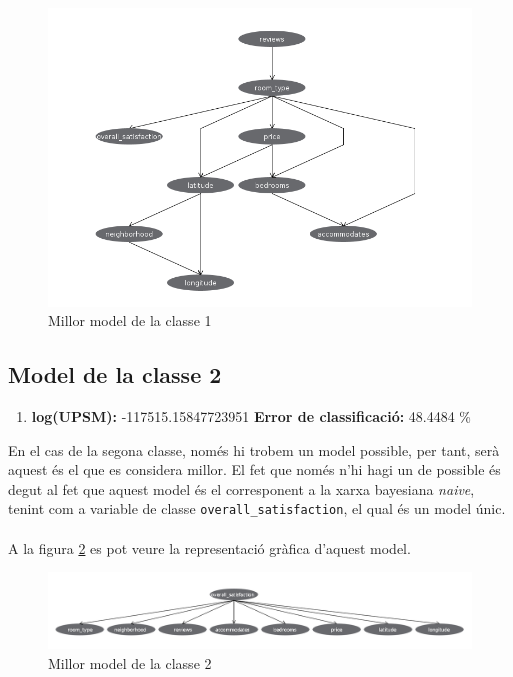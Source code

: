 	\begin{figure}[H]
		\centering
		\includegraphics[width=12cm]{imgs/modelclasse1.png}
		\caption{Millor model de la classe 1}
		\label{fig:model1}
	\end{figure}
	\vspace{0.5cm}
	
	\subsection{Model de la classe 2}
	\begin{enumerate}
		\item \textbf{log(UPSM):} -117515.15847723951 \textbf{Error de classificació:} 48.4484 \%
	\end{enumerate}
	\vspace{0.5cm}
	En el cas de la segona classe, només hi trobem un model possible, per tant, serà aquest és el que es considera millor. El fet que només n'hi hagi un de possible és degut al fet que aquest model és el corresponent a la xarxa bayesiana \textit{naive}, tenint com a variable de classe \verb|overall_satisfaction|, el qual és un model únic.\\
	\\
	A la figura \ref{fig:model2} es pot veure la representació gràfica d'aquest model.
	\vspace{0.3cm}
	\begin{figure}[H]
		\centering
		\includegraphics[width=15cm]{imgs/model2.png}
		\caption{Millor model de la classe 2}
		\label{fig:model2}
	\end{figure}
	\vspace{0.5cm}
